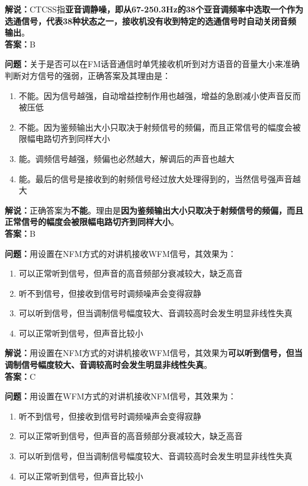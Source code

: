\documentclass{ctexbook}
\begin{document}
\noindent\textbf{解说：}CTCSS指\textbf{亚音调静噪，即从67-250.3Hz的38个亚音调频率中选取一个作为选通信号，代表38种状态之一，接收机没有收到特定的选通信号时自动关闭音频输出}。\\\noindent\textbf{答案：}B


\bigskip


\noindent\textbf{问题：}关于是否可以在FM话音通信时单凭接收机听到对方语音的音量大小来准确判断对方信号的强弱，正确答案及其理由是：

\begin{enumerate}[label=\Alph*), leftmargin=3em]
	\item 不能。因为信号越强，自动增益控制作用也越强，增益的急剧减小使声音反而被压低
	\item 不能。因为鉴频输出大小只取决于射频信号的频偏，而且正常信号的幅度会被限幅电路切齐到同样大小
	\item 能。调频信号越强，频偏也必然越大，解调后的声音也越大
	\item 能。最后的信号是接收到的射频信号经过放大处理得到的，当然信号强声音越大
\end{enumerate}

\noindent\textbf{解说：}正确答案为\textbf{不能}。理由是\textbf{因为鉴频输出大小只取决于射频信号的频偏，而且正常信号的幅度会被限幅电路切齐到同样大小}。\\\noindent\textbf{答案：}B


\bigskip


\noindent\textbf{问题：}用设置在NFM方式的对讲机接收WFM信号，其效果为：

\begin{enumerate}[label=\Alph*), leftmargin=3em]
	\item 可以正常听到信号，但声音的高音频部分衰减较大，缺乏高音
	\item 听不到信号，但接收到信号时调频噪声会变得寂静
	\item 可以听到信号，但当调制信号幅度较大、音调较高时会发生明显非线性失真
	\item 可以正常听到信号，但声音比较小
\end{enumerate}

\noindent\textbf{解说：}用设置在NFM方式的对讲机接收WFM信号，其效果为\textbf{可以听到信号，但当调制信号幅度较大、音调较高时会发生明显非线性失真}。\\\noindent\textbf{答案：}C


\bigskip


\noindent\textbf{问题：}用设置在WFM方式的对讲机接收NFM信号，其效果为：

\begin{enumerate}[label=\Alph*), leftmargin=3em]
	\item 听不到信号，但接收到信号时调频噪声会变得寂静
	\item 可以正常听到信号，但声音的高音频部分衰减较大，缺乏高音
	\item 可以听到信号，但当调制信号幅度较大、音调较高时会发生明显非线性失真
	\item 可以正常听到信号，但声音比较小
\end{enumerate}
\end{document}
